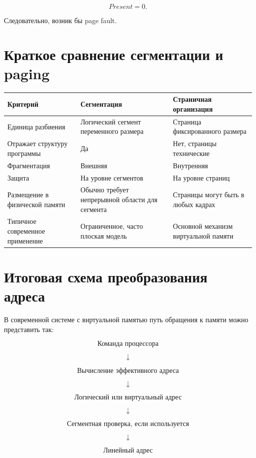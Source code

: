 \documentclass[a4paper,12pt]{article}
\begin{document}
\[
Present = 0.
\]

Следовательно, возник бы page fault.

\section{Краткое сравнение сегментации и paging}

\begin{center}
\begin{tabular}{|p{4cm}|p{5cm}|p{5cm}|}
\hline
\textbf{Критерий} & \textbf{Сегментация} & \textbf{Страничная организация} \\
\hline
Единица разбиения & Логический сегмент переменного размера & Страница фиксированного размера \\
\hline
Отражает структуру программы & Да & Нет, страницы технические \\
\hline
Фрагментация & Внешняя & Внутренняя \\
\hline
Защита & На уровне сегментов & На уровне страниц \\
\hline
Размещение в физической памяти & Обычно требует непрерывной области для сегмента & Страницы могут быть в любых кадрах \\
\hline
Типичное современное применение & Ограниченное, часто плоская модель & Основной механизм виртуальной памяти \\
\hline
\end{tabular}
\end{center}

\section{Итоговая схема преобразования адреса}

В современной системе с виртуальной памятью путь обращения к памяти можно представить так:

\[
\boxed{
\text{Команда процессора}
}
\]

\[
\downarrow
\]

\[
\boxed{
\text{Вычисление эффективного адреса}
}
\]

\[
\downarrow
\]

\[
\boxed{
\text{Логический или виртуальный адрес}
}
\]

\[
\downarrow
\]

\[
\boxed{
\text{Сегментная проверка, если используется}
}
\]

\[
\downarrow
\]

\[
\boxed{
\text{Линейный адрес}
}
\]
\end{document}
